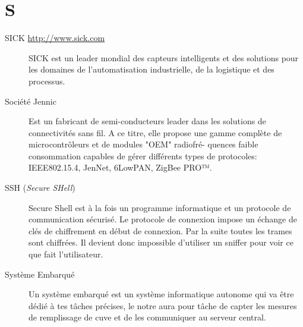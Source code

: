 \section{S}

\begin{description}

\item[SICK \url{http://www.sick.com}]
SICK est un leader mondial des capteurs intelligents et des solutions pour les 
domaines de l’automatisation industrielle, de la logistique et des processus.

\item[Société Jennic]
Est un fabricant  de semi-conducteurs leader dans les solutions de connectivités sans fil. A ce titre, elle propose une gamme complète de microcontrôleurs et de modules "OEM" radiofré-
quences faible consommation capables de gérer différents types de protocoles: IEEE802.15.4, JenNet, 6LowPAN, ZigBee PRO™.

\item[SSH (\textsl{Secure SHell})]
Secure Shell est à la fois un programme informatique et un protocole de communication sécurisé. Le protocole de connexion impose un échange de clés de chiffrement en début de connexion. Par la suite toutes les trames sont chiffrées. Il devient donc impossible d'utiliser un sniffer pour voir ce que fait l'utilisateur.





\item[Système Embarqué] Un système embarqué est un système informatique autonome
qui va être dédié à tes tâches précises, le notre aura pour tâche de capter les 
mesures de remplissage de cuve et de les communiquer au serveur central.


\end{description}


